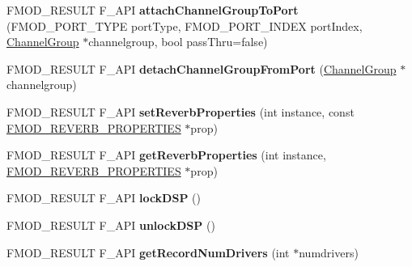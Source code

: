 \begin{DoxyCompactItemize}
\item 
\hypertarget{class_f_m_o_d_1_1_system_a8f5aa192ebfeef5b0a1fe2f01a16433c}{F\+M\+O\+D\+\_\+\+R\+E\+S\+U\+L\+T F\+\_\+\+A\+P\+I {\bfseries attach\+Channel\+Group\+To\+Port} (F\+M\+O\+D\+\_\+\+P\+O\+R\+T\+\_\+\+T\+Y\+P\+E port\+Type, F\+M\+O\+D\+\_\+\+P\+O\+R\+T\+\_\+\+I\+N\+D\+E\+X port\+Index, \hyperlink{class_f_m_o_d_1_1_channel_group}{Channel\+Group} $\ast$channelgroup, bool pass\+Thru=false)}\label{class_f_m_o_d_1_1_system_a8f5aa192ebfeef5b0a1fe2f01a16433c}

\item 
\hypertarget{class_f_m_o_d_1_1_system_a47e2328d83db76cca6de74e188166937}{F\+M\+O\+D\+\_\+\+R\+E\+S\+U\+L\+T F\+\_\+\+A\+P\+I {\bfseries detach\+Channel\+Group\+From\+Port} (\hyperlink{class_f_m_o_d_1_1_channel_group}{Channel\+Group} $\ast$channelgroup)}\label{class_f_m_o_d_1_1_system_a47e2328d83db76cca6de74e188166937}

\item 
\hypertarget{class_f_m_o_d_1_1_system_abd46ed663c26bf687086c2992580a677}{F\+M\+O\+D\+\_\+\+R\+E\+S\+U\+L\+T F\+\_\+\+A\+P\+I {\bfseries set\+Reverb\+Properties} (int instance, const \hyperlink{struct_f_m_o_d___r_e_v_e_r_b___p_r_o_p_e_r_t_i_e_s}{F\+M\+O\+D\+\_\+\+R\+E\+V\+E\+R\+B\+\_\+\+P\+R\+O\+P\+E\+R\+T\+I\+E\+S} $\ast$prop)}\label{class_f_m_o_d_1_1_system_abd46ed663c26bf687086c2992580a677}

\item 
\hypertarget{class_f_m_o_d_1_1_system_a62268e4924d3543b9e25c1120ea62298}{F\+M\+O\+D\+\_\+\+R\+E\+S\+U\+L\+T F\+\_\+\+A\+P\+I {\bfseries get\+Reverb\+Properties} (int instance, \hyperlink{struct_f_m_o_d___r_e_v_e_r_b___p_r_o_p_e_r_t_i_e_s}{F\+M\+O\+D\+\_\+\+R\+E\+V\+E\+R\+B\+\_\+\+P\+R\+O\+P\+E\+R\+T\+I\+E\+S} $\ast$prop)}\label{class_f_m_o_d_1_1_system_a62268e4924d3543b9e25c1120ea62298}

\item 
\hypertarget{class_f_m_o_d_1_1_system_a3e214796058609cdf622c8be675f43a9}{F\+M\+O\+D\+\_\+\+R\+E\+S\+U\+L\+T F\+\_\+\+A\+P\+I {\bfseries lock\+D\+S\+P} ()}\label{class_f_m_o_d_1_1_system_a3e214796058609cdf622c8be675f43a9}

\item 
\hypertarget{class_f_m_o_d_1_1_system_a2caf736a103467e81ff40a34e9702423}{F\+M\+O\+D\+\_\+\+R\+E\+S\+U\+L\+T F\+\_\+\+A\+P\+I {\bfseries unlock\+D\+S\+P} ()}\label{class_f_m_o_d_1_1_system_a2caf736a103467e81ff40a34e9702423}

\item 
\hypertarget{class_f_m_o_d_1_1_system_a0729c552a7f61ddb37a81feb1469c9e8}{F\+M\+O\+D\+\_\+\+R\+E\+S\+U\+L\+T F\+\_\+\+A\+P\+I {\bfseries get\+Record\+Num\+Drivers} (int $\ast$numdrivers)}\label{class_f_m_o_d_1_1_system_a0729c552a7f61ddb37a81feb1469c9e8}


\end{DoxyCompactItemize}
